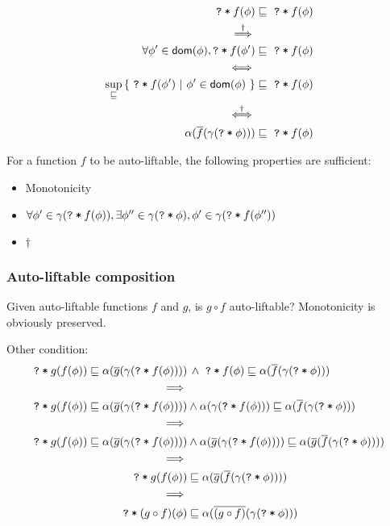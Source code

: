 \documentclass[11pt,a4paper]{article}
\newcommand{\ttt}{\texttt}
\newcommand{\predicate}{\textsf}
\newcommand{\dom}{\predicate{dom}}
\newcommand{\qm}{\ttt{?}}
\newcommand{\withqm}[1]{\ttt{\qm\:*\:$#1$}}
\begin{document}
\begin{align*}
\withqm{f(\phi)} &\sqsubseteq \,\,\withqm{f(\phi)} \\
\overset{\dagger}{\implies} \\
\forall \phi' \in \dom(\phi), \withqm{f(\phi')} &\sqsubseteq \,\,\withqm{f(\phi)} \\
\iff \\
\sup_{\sqsubseteq} {\{~ \withqm{f(\phi')} ~|~ \phi' \in \dom(\phi) ~\}} &\sqsubseteq \,\,\withqm{f(\phi)} \\
\overset{\dagger}{\iff} \\
\alpha(\overline{f}(\gamma(\withqm{\phi}))) &\sqsubseteq \,\,\withqm{f(\phi)}
\end{align*}

For a function $f$ to be auto-liftable, the following properties are sufficient:
\begin{itemize}
    \item Monotonicity
    \item $\forall \phi' \in \gamma(\withqm{f(\phi)}), \exists \phi'' \in \gamma(\withqm{\phi}), \phi' \in \gamma(\withqm{f(\phi'')})$ 
    \item $\dagger$
\end{itemize}

\subsubsection{Auto-liftable composition}
Given auto-liftable functions $f$ and $g$, is $g \circ f$ auto-liftable?
Monotonicity is obviously preserved.

Other condition:
\begin{align*}
\withqm{g(f(\phi))} \sqsubseteq \alpha(\overline{g}(\gamma(\withqm{f(\phi)}))) &\,\wedge
\,\,\withqm{f(\phi)} \sqsubseteq \alpha(\overline{f}(\gamma(\withqm{\phi}))) \\
\implies \\
\withqm{g(f(\phi))} \sqsubseteq \alpha(\overline{g}(\gamma(\withqm{f(\phi)}))) &\wedge
\alpha(\gamma(\withqm{f(\phi)})) \sqsubseteq \alpha(\overline{f}(\gamma(\withqm{\phi}))) \\
\implies \\
\withqm{g(f(\phi))} \sqsubseteq \alpha(\overline{g}(\gamma(\withqm{f(\phi)}))) &\wedge
\alpha(\overline{g}(\gamma(\withqm{f(\phi)}))) \sqsubseteq \alpha(\overline{g}(\overline{f}(\gamma(\withqm{\phi})))) \\
\implies \\
\withqm{g(f(\phi))} &\sqsubseteq \alpha(\overline{g}(\overline{f}(\gamma(\withqm{\phi})))) \\
\implies \\
\withqm{(g \circ f)(\phi)} &\sqsubseteq \alpha(\overline{(g \circ f)}(\gamma(\withqm{\phi}))) \\
\end{align*}
\end{document}
